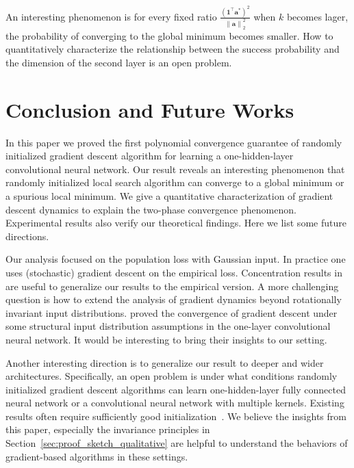 \documentclass{article}
\newcommand{\secondlayer}{a}
\newcommand{\vect}[1]{\mathbf{#1}}
\newcommand{\norm}[1]{\left\|#1\right\|}
\begin{document}
An interesting phenomenon is for every fixed ratio  $\frac{(\vect{1}^\top\vect{\secondlayer}^*)^2}{\norm{\vect{\secondlayer}}_2^2}$ when $k$ becomes lager, the probability of converging to the global minimum becomes smaller.
How to quantitatively characterize  the relationship between the success probability and the dimension of the second layer is an open problem.



\section{Conclusion and Future Works}
\label{sec:con}
In this paper we proved the first polynomial convergence guarantee of randomly initialized gradient descent algorithm for learning a one-hidden-layer convolutional neural network.
Our result reveals an interesting phenomenon that randomly initialized local search algorithm can converge to a global minimum or a spurious local minimum.
We give a quantitative characterization of gradient descent dynamics to explain the two-phase convergence phenomenon.
Experimental results also verify our theoretical findings.
Here we list some future directions.

Our analysis focused on the population loss with Gaussian input. 
In practice one uses (stochastic) gradient descent on the empirical loss.
Concentration results in~\citep{mei2016landscape,soltanolkotabi2017learning} are useful to generalize our results to the empirical version.
A more challenging question is how to extend the analysis of gradient dynamics beyond rotationally invariant input distributions.
\citet{du2017convolutional} proved the convergence of gradient descent under some structural input distribution assumptions in the one-layer convolutional neural network.
It would be interesting to bring their insights to our setting.

Another interesting direction is to generalize our result to deeper and wider architectures. 
Specifically, an open problem is under what conditions randomly initialized gradient descent algorithms can learn one-hidden-layer fully connected neural network or a convolutional neural network with multiple kernels. 
Existing results often require sufficiently good initialization~\citep{zhong2017learning,zhong2017recovery}.
We believe the insights from this paper, especially the invariance principles in Section~\ref{sec:proof_sketch_qualitative} are helpful to understand the behaviors of gradient-based algorithms in these settings.
\end{document}
